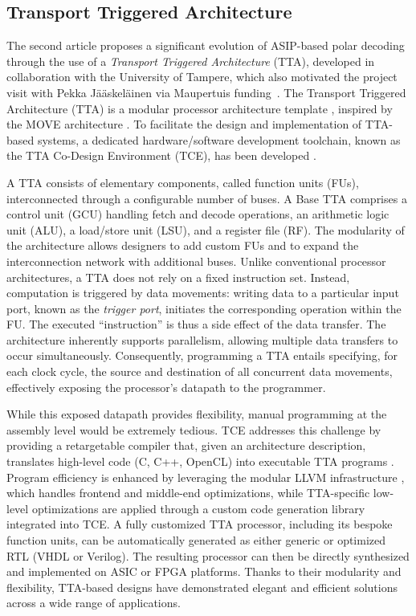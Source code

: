 \documentclass[11pt]{report}
\begin{document}
\subsection{Transport Triggered Architecture}The second article proposes a significant evolution of ASIP-based polar decoding through the use of a \textit{Transport Triggered Architecture} (TTA), developed in collaboration with the University of Tampere, which also motivated the project visit with Pekka Jääskeläinen via Maupertuis funding~\cite{leonardon:hal-01978830}.
The Transport Triggered Architecture (TTA) is a modular processor architecture template \cite{corporaal_microprocessor_1997}, inspired by the MOVE architecture \cite{1051344}. To facilitate the design and implementation of TTA-based systems, a dedicated hardware/software development toolchain, known as the TTA Co-Design Environment (TCE), has been developed \cite{Esko:2010:CED:1933303.1933795}.

A TTA consists of elementary components, called function units (FUs), interconnected through a configurable number of buses. A Base TTA comprises a control unit (GCU) handling fetch and decode operations, an arithmetic logic unit (ALU), a load/store unit (LSU), and a register file (RF). The modularity of the architecture allows designers to add custom FUs and to expand the interconnection network with additional buses.
Unlike conventional processor architectures, a TTA does not rely on a fixed instruction set. Instead, computation is triggered by data movements: writing data to a particular input port, known as the \textit{trigger port}, initiates the corresponding operation within the FU. The executed “instruction” is thus a side effect of the data transfer. The architecture inherently supports parallelism, allowing multiple data transfers to occur simultaneously. Consequently, programming a TTA entails specifying, for each clock cycle, the source and destination of all concurrent data movements, effectively exposing the processor’s datapath to the programmer.

While this exposed datapath provides flexibility, manual programming at the assembly level would be extremely tedious. TCE addresses this challenge by providing a retargetable compiler that, given an architecture description, translates high-level code (C, C++, OpenCL) into executable TTA programs \cite{Esko:2010:CED:1933303.1933795}. Program efficiency is enhanced by leveraging the modular LLVM infrastructure \cite{lattner_llvm:_2004}, which handles frontend and middle-end optimizations, while TTA-specific low-level optimizations are applied through a custom code generation library integrated into TCE.
A fully customized TTA processor, including its bespoke function units, can be automatically generated as either generic or optimized RTL (VHDL or Verilog). The resulting processor can then be directly synthesized and implemented on ASIC or FPGA platforms. Thanks to their modularity and flexibility, TTA-based designs have demonstrated elegant and efficient solutions across a wide range of applications.
\end{document}
